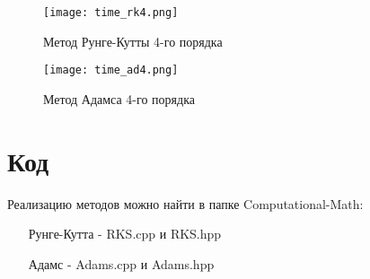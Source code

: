 \documentclass[a4paper,12pt]{article} %
\begin{document}
\begin{figure}[H]
	\centering
	\texttt{[image: time\_rk4.png]}
	\caption{Метод Рунге-Кутты 4-го порядка}
\end{figure}

\begin{figure}[H]
	\centering
	\texttt{[image: time\_ad4.png]}
	\caption{Метод Адамса 4-го порядка}
\end{figure}

\section*{Код}

Реализацию методов можно найти в папке Computational-Math:
\begin{itemize}
	\item[Рунге-Кутта - ] RKS.cpp и RKS.hpp
	\item[Адамс - ] Adams.cpp и Adams.hpp
\end{itemize}
\end{document}
